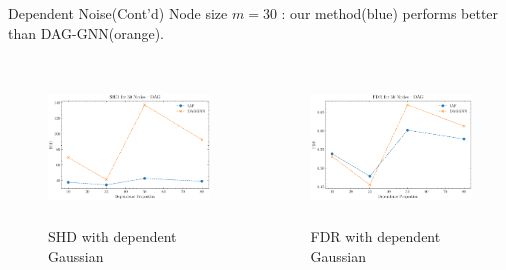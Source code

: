 \documentclass{beamer}
\begin{document}
\begin{frame}{Dependent Noise(Cont'd)}
    Node size $m=30$ : our method(blue) performs better than DAG-GNN(orange).
    \begin{columns}
        \begin{column}{0.5\textwidth}
            \begin{figure}
                \centering
                \includegraphics[height=4cm]{fig/SHD_dependence_30_DAG_threshold0.3.pdf}
                \caption{SHD with dependent Gaussian}
                \label{fig:dep_gaussian_shd_30}
            \end{figure}
        \end{column}
        \begin{column}{0.5\textwidth}
            \begin{figure}
                \centering
                \includegraphics[height=4cm]{fig/FDR_dependence_30_DAG_threshold0.3.pdf}
                \caption{FDR with dependent Gaussian}
                \label{fig:dep_gaussian_fdr_30}
            \end{figure}
        \end{column}
    \end{columns}
\end{frame}
\end{document}
